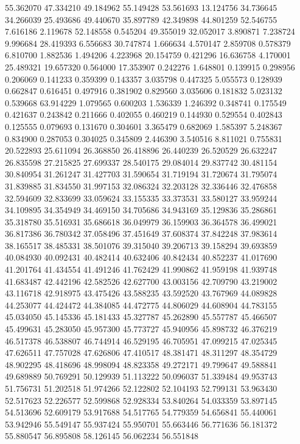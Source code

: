 55.362070
47.334210
49.184962
55.149428
53.561693
13.124756
34.736645
34.266039
25.493686
49.440670
35.897789
42.349898
44.801259
52.546755
7.616186
2.119678
52.148558
0.545204
49.355019
32.052017
3.890871
7.238724
9.996684
28.419393
6.556683
30.747874
1.666634
4.570147
2.859708
0.578379
6.810700
1.882536
1.494206
4.223968
20.154759
0.421296
16.636758
4.170001
25.489321
19.657320
0.564000
17.353907
0.242276
1.648801
0.139915
0.298956
0.206069
0.141233
0.359399
0.143357
3.035798
0.447325
5.055573
0.128939
0.662847
0.616451
0.497916
0.381902
0.829560
3.035606
0.181832
5.023132
0.539668
63.914229
1.079565
0.600203
1.536339
1.246392
0.348741
0.175549
0.421637
0.243842
0.211666
0.402055
0.460219
0.144930
0.529554
0.402843
0.125555
0.079693
0.131670
0.304601
3.365479
0.682069
1.585397
5.248367
0.834900
0.287053
0.304025
0.345809
2.446390
3.540516
8.811021
0.755831
20.522893
25.611094
26.368850
26.418896
26.440239
26.520529
26.632247
26.835598
27.215825
27.699337
28.540175
29.084014
29.837742
30.481154
30.840954
31.261247
31.427703
31.590654
31.719194
31.720674
31.795074
31.839885
31.834550
31.997153
32.086324
32.203128
32.336446
32.476858
32.594609
32.833699
33.059624
33.155335
33.373531
33.580127
33.959244
34.109895
34.354949
34.469150
34.705686
34.943169
35.129836
35.286861
35.318780
35.516931
35.686618
36.049979
36.159903
36.364578
36.499021
36.817386
36.780342
37.058496
37.451649
37.608374
37.842248
37.983614
38.165517
38.485331
38.501076
39.315040
39.206713
39.158294
39.693859
40.084930
40.092431
40.482414
40.632406
40.842434
40.852237
41.017690
41.201764
41.434554
41.491246
41.762429
41.990862
41.959198
41.939748
41.683487
42.442196
42.582526
42.627700
43.003156
42.709790
43.219002
43.116718
42.918975
43.475426
43.588235
43.592520
43.767969
44.089828
44.253077
44.424472
44.384085
44.472775
44.806029
44.608904
44.783155
45.034050
45.145336
45.181433
45.327787
45.262890
45.557787
45.466507
45.499631
45.283050
45.957300
45.773727
45.940956
45.898732
46.376219
46.517378
46.538807
46.744914
46.529195
46.705951
47.099215
47.025345
47.626511
47.757028
47.626806
47.410517
48.381471
48.311297
48.354729
48.902295
48.418696
48.998094
48.823358
49.272171
49.799647
49.588841
49.689889
50.769291
50.129939
51.113222
50.096037
51.339484
49.953743
51.756731
51.202518
51.974266
52.122802
52.104193
52.799131
53.963430
52.517623
52.226577
52.599868
52.928334
53.840264
54.033359
53.897145
54.513696
52.609179
53.917688
54.517765
54.779359
54.656841
55.440061
53.942946
55.549147
55.937424
55.950701
55.663446
56.771636
56.181372
55.880547
56.895808
58.126145
56.062234
56.551848

